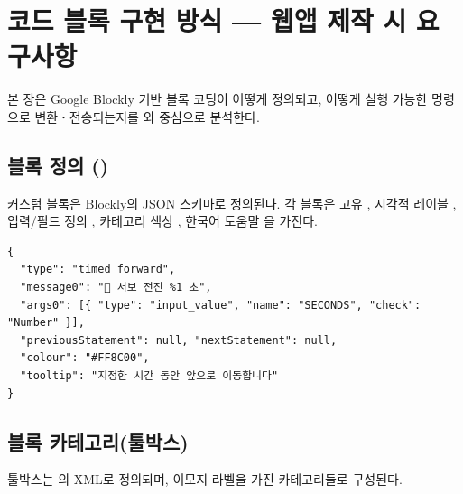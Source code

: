 \section{코드 블록 구현 방식 --- 웹앱 제작 시 요구사항}

본 장은 Google Blockly 기반 블록 코딩이 어떻게 정의되고, 어떻게 실행 가능한
명령으로 변환\textbf{·}전송되는지를 와
 중심으로 분석한다.

\subsection{블록 정의 ()}

커스텀 블록은 Blockly의 JSON 스키마로 정의된다. 각 블록은 고유 ,
시각적 레이블 , 입력/필드 정의 , 카테고리 색상
, 한국어 도움말 을 가진다.

\begin{verbatim}
{
  "type": "timed_forward",
  "message0": "🚗 서보 전진 %1 초",
  "args0": [{ "type": "input_value", "name": "SECONDS", "check": "Number" }],
  "previousStatement": null, "nextStatement": null,
  "colour": "#FF8C00",
  "tooltip": "지정한 시간 동안 앞으로 이동합니다"
}
\end{verbatim}

\subsection{블록 카테고리(툴박스)}

툴박스는 의 XML로 정의되며, 이모지 라벨을 가진 카테고리들로
구성된다.

